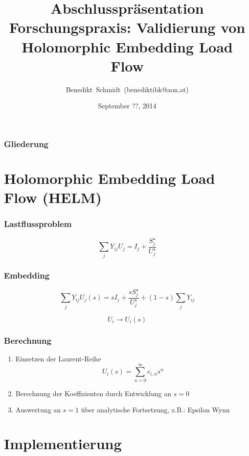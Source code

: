 \documentclass[hyperref={pdfpagelabels=false},compress]{beamer}
\title{Abschlusspräsentation Forschungspraxis: Validierung von Holomorphic Embedding Load Flow}
\author[Schmidt]{Benedikt~Schmidt{\fontfamily{phv}\selectfont~(benediktibk@aon.at)}}
\institute{Technische Universität München}
\date{September ??, 2014}
\begin{document}
\begin{frame}
	\titlepage
\end{frame}

\begin{frame}
	\frametitle{Gliederung}
	\tableofcontents
\end{frame}

\section{Holomorphic Embedding Load Flow (HELM)}
\begin{frame}
	\frametitle{Lastflussproblem}
	\begin{figure}
		\centering
		
	\end{figure}	
	\begin{equation*}
		\sum_j Y_{ij} U_{j} = I_j + \frac{S_j^\star}{U_j^\star}
	\end{equation*}
\end{frame}

\begin{frame}
	\frametitle{Embedding}
	\begin{equation*}
		\sum_j Y_{ij} U_{j}(s) = s I_j + \frac{s S_j^\star}{U_j^\star} + (1 - s) \sum_j Y_{ij}
	\end{equation*}
	
	\begin{equation*}
		U_i \rightarrow U_i(s)
	\end{equation*}
\end{frame}

\begin{frame}
	\frametitle{Berechnung}
	\begin{enumerate}
		\item Einsetzen der Laurent-Reihe
			\begin{equation*}
				U_i(s) = \sum_{n = 0}^\infty c_{i,n} s^n
			\end{equation*}
		\item Berechnung der Koeffizienten durch Entwicklung an $s = 0$
		\item Auswertung an $s = 1$ über analytische Fortsetzung, z.B.: Epsilon Wynn
	\end{enumerate}
\end{frame}

\section{Implementierung}
\end{document}
